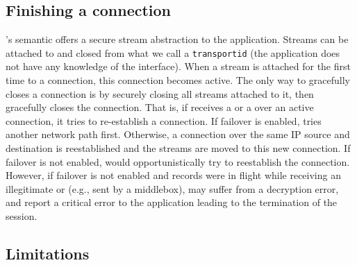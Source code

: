 \subsection{Finishing a \tcpls connection}
\tcpls's semantic offers a secure stream abstraction to the application.
Streams can be attached to and closed from what we call a \texttt{transportid}
(the application does not have any knowledge of the \tcp interface). When a
stream is attached for the first time to a \tcp connection, this connection
becomes active. The only way to gracefully closes a \tcp connection is by
securely closing all streams attached to it, then \tcpls gracefully closes the
\tcp connection. That is, if \tcpls receives a \rst or a \fin over an active
\tcp connection, it tries to re-establish a \tcp connection. If failover is
enabled, \tcpls tries another network path first. Otherwise, a connection over
the same IP source and destination is reestablished and the streams are moved to
this new \tcp connection. If failover is not enabled, \tcpls would
opportunistically try to reestablish the connection. However, if failover is not
enabled and records were in flight while receiving an illegitimate \rst or \fin
(e.g., sent by a middlebox), \tcpls may suffer from a decryption error, and
report a critical error to the application leading to the termination of the
session.

\subsection{Limitations}

